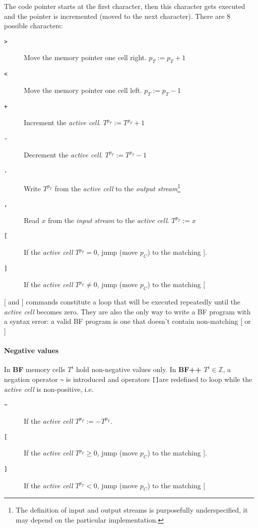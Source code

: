 The code pointer starts at the first character, then this character gets executed and the pointer is incremented (moved to the next character).
There are 8 possible characters:

\begin{description}
\item[\texttt{>}] Move the memory pointer one cell right. $p_T := p_T + 1$
\item[\texttt{<}] Move the memory pointer one cell left. $p_T := p_T - 1$
\item[\texttt{+}] Increment the \textit{active cell}. $T^{p_T} := T^{p_T} + 1$
\item[\texttt{-}] Decrement the \textit{active cell}. $T^{p_T} := T^{p_T} - 1$
\item[\texttt{.}] Write $T^{p_T}$ from the \textit{active cell} to the \textit{output stream}\footnote{The definition of input and output streams is purposefully underspecified, it may depend on the particular implementation.}
\item[\texttt{,}] Read $x$ from the \textit{input stream} to the \textit{active cell}. $T^{p_T} := x$
\item[ \texttt{[} ] If the \textit{active cell} $T^{p_T} = 0$, jump (move $p_C$) to the matching $]$.
\item[ \texttt{]} ] If the \textit{active cell} $T^{p_T} \neq 0$, jump (move $p_C$) to the matching $[$
\end{description}

[ and ] commands constitute a loop that will be executed repeatedly until the \textit{active cell} becomes zero.
They are also the only way to write a BF program with a syntax error: a valid BF program is one that doesn't contain non-matching [ or ]


\paragraph{Negative values}

In \textbf{BF} memory cells $T^i$ hold non-negative values only.
In \textbf{BF++} $T^i \in \mathbb{Z}$, a negation operator \texttt{\~} is introduced and operators \texttt{[]}are redefined to loop while the \textit{active cell} is non-positive, i.e.

\begin{description}
\item[ \texttt{\~} ] If the \textit{active cell} $T^{p_T} := - T^{p_T}$.
\item[ \texttt{[} ] If the \textit{active cell} $T^{p_T} \geq 0$, jump (move $p_C$) to the matching $]$.
\item[ \texttt{]} ] If the \textit{active cell} $T^{p_T} < 0$, jump (move $p_C$) to the matching $[$
\end{description}


